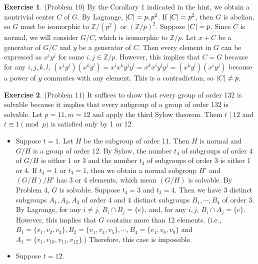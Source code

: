\documentclass[12pt, psamsfonts]{amsart}
\theoremstyle{definition}
\newtheorem*{exer}{Exercise}
\theoremstyle{remark}
\numberwithin{equation}{section}
\begin{document}
\begin{exer}{(Problem 10)}
  By the Corollary 1 indicated in the hint, we obtain a nontrivial center $C$ of $G$.
  By Lagrange, $\abs{C} = p, p^2$.
  If $\abs{C} = p^2$, then $G$ is abelian, so $G$ must be isomorphic to $\mathbb{Z} / (p^2)$ or $(\mathbb{Z} / p)^2$.
  Suppose $\abs{C} = p$.
  Since $C$ is normal, we will consider $G / C$, which is isomorphic to $\mathbb{Z} / p$.
  Let $x + C$ be a generator of $G / C$ and $y$ be a generator of $C$.
  Then every element in $G$ can be expressed as $x^iy^j$ for some $i, j \in \mathbb{Z}/p$.
  However, this implies that $C = G$ because for any $i, j, k, l$, $(x^iy^j)(x^ky^l) = x^ix^ky^jy^l = x^kx^iy^ly^j = (x^ky^l)(x^iy^j)$ because a power of $y$ commutes with any element.
  This is a contradiction, so $\abs{C} \ne p$.
\end{exer}

\begin{exer}{(Problem 11)}
  It suffices to show that every group of order 132 is solvable because it implies that every subgroup of a group of order 132 is solvable.
  Let $p = 11, m = 12$ and apply the third Sylow theorem.
  Them $t \mid 12$ and $t \equiv 1 \pmod p$ is satisfied only by 1 or 12.
  \begin{itemize}
    \item
      Suppose $t = 1$.
      Let $H$ be the subgroup of order 11.
      Then $H$ is normal and $G / H$ is a group of order 12.
      By Sylow, the number $t_4$ of subgroups of order 4 of $G / H$ is either 1 or 3 and the number $t_3$ of subgroups of order 3 is either 1 or 4.
      If $t_4 = 1$ or $t_3 = 1$, then we obtain a normal subgroup $H'$ and $(G / H) / H'$ has 3 or 4 elements, which mean $(G / H)$ is solvable.
      By Problem 4, $G$ is solvable.
      Suppose $t_4 = 3$ and $t_3 = 4$.
      Then we have 3 distinct subgroups $A_1, A_2, A_3$ of order 4 and 4 distinct subgroups $B_1, \cdots, B_4$ of order 3.
      By Lagrange, for any $i \ne j$, $B_i \cap B_j = \{ e \}$, and, for any $i, j$, $B_i \cap A_j = \{ e \}$.
      However, this implies that $G$ contains more than 12 elements.
      (i.e., $B_1 = \{ v_1, v_2, v_3 \}, B_2 = \{v_1, v_4, v_5 \}, \cdots, B_4 = \{ v_1, v_8, v_9 \}$ and $A_1 = \{ v_1, v_{10}, v_{11}, v_{12} \}$.)
      Therefore, this case is impossible.
    \item
      Suppose $t = 12$.
  \end{itemize}
\end{exer}
\end{document}
